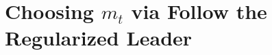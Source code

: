 \documentclass[paper_icml.tex]{subfiles}
\begin{document}
\section{Choosing $m_t$ via Follow the Regularized Leader} 
\label{sec:ftrl-aux}
\end{document}
